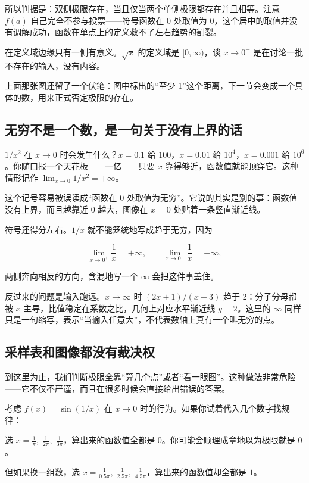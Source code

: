 所以判据是：双侧极限存在，当且仅当两个单侧极限都存在并且相等。注意 \(f(a)\) 自己完全不参与投票——符号函数在 0 处取值为 0，这个居中的取值并没有调解成功，函数在单点上的定义救不了左右趋势的割裂。

在定义域边缘只有一侧有意义。\(\sqrt{x}\) 的定义域是 \([0,\infty)\)，谈 \(x\to0^-\) 是在讨论一批不存在的输入，没有内容。

上面那张图还留了一个伏笔：图中标出的``至少 1''这个距离，下一节会变成一个具体的数，用来正式否定极限的存在。

\subsection{无穷不是一个数，是一句关于没有上界的话}

\(1/x^2\) 在 \(x\to0\) 时会发生什么？\(x=0.1\) 给 \(100\)，\(x=0.01\) 给 \(10^4\)，\(x=0.001\) 给 \(10^6\)。你随口报一个天花板——一亿——只要 \(x\) 靠得够近，函数值就能顶穿它。这种情形记作 \(\lim_{x\to0}1/x^2=+\infty\)。

这个记号容易被误读成``函数在 0 处取值为无穷''。它说的其实是别的事：函数值没有上界，而且越靠近 0 越大，图像在 \(x=0\) 处贴着一条竖直渐近线。

符号还得分左右。\(1/x\) 就不能笼统地写成趋于无穷，因为

\[
\lim_{x\to0^+}\frac1x=+\infty,\qquad
\lim_{x\to0^-}\frac1x=-\infty,
\]

两侧奔向相反的方向，含混地写一个 \(\infty\) 会把这件事盖住。

反过来的问题是输入跑远。\(x\to\infty\) 时 \((2x+1)/(x+3)\) 趋于 2：分子分母都被 \(x\) 主导，比值稳定在系数之比，几何上对应水平渐近线 \(y=2\)。这里的 \(\infty\) 同样只是一句缩写，表示``当输入任意大''，不代表数轴上真有一个叫无穷的点。

\subsection{采样表和图像都没有裁决权}

到这里为止，我们判断极限全靠``算几个点''或者``看一眼图''。这种做法非常危险——它不仅不严谨，而且在很多时候会直接给出错误的答案。

考虑 \(f(x)=\sin(1/x)\) 在 \(x\to0\) 时的行为。如果你试着代入几个数字找规律：

选 \(x=\frac{1}{\pi},\;\frac{1}{2\pi},\;\frac{1}{3\pi}\)，算出来的函数值全都是 \(0\)。你可能会顺理成章地以为极限就是 \(0\)。

但如果换一组数，选 \(x=\frac{1}{0.5\pi},\;\frac{1}{2.5\pi},\;\frac{1}{4.5\pi}\)，算出来的函数值却全都是 \(1\)。

